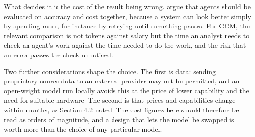 What decides it is the cost of the result being wrong.
\citet{kapoor2024ai} argue that agents should be evaluated on accuracy and cost together, because a system can look better simply by spending more, for instance by retrying until something passes.
For GGM, the relevant comparison is not tokens against salary but the time an analyst needs to check an agent's work against the time needed to do the work, and the risk that an error passes the check unnoticed.

Two further considerations shape the choice.
The first is data: sending proprietary source data to an external provider may not be permitted, and an open-weight model run locally avoids this at the price of lower capability and the need for suitable hardware.
The second is that prices and capabilities change within months, as Section 4.2 noted.
The cost figures here should therefore be read as orders of magnitude, and a design that lets the model be swapped is worth more than the choice of any particular model.
